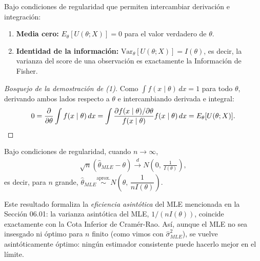 \begin{propiedad}
	Bajo condiciones de regularidad que permiten intercambiar derivación e integración:
	\begin{enumerate}
		\item \textbf{Media cero:} $E_\theta[U(\theta;X)] = 0$ para el valor verdadero de $\theta$.
		\item \textbf{Identidad de la información:} $\text{Var}_\theta[U(\theta;X)] = I(\theta)$, es decir, la varianza del score de una observación es exactamente la Información de Fisher.
	\end{enumerate}
\end{propiedad}

\begin{proof}[Bosquejo de la demostración de (1)]
	Como $\int f(x\mid\theta)\,dx=1$ para todo $\theta$, derivando ambos lados respecto a $\theta$ e intercambiando derivada e integral:
	\begin{align}
		0 = \frac{\partial}{\partial\theta}\int f(x\mid\theta)\,dx = \int \frac{\partial f(x\mid\theta)/\partial\theta}{f(x\mid\theta)} f(x\mid\theta)\,dx = E_\theta[U(\theta;X)]. \qedhere
	\end{align}
\end{proof}

\begin{teorema}
	 \label{eq:6.3.1}
	Bajo condiciones de regularidad, cuando $n\to\infty$,
	\begin{align}
		\sqrt{n}\left(\hat\theta_{MLE} - \theta\right) \xrightarrow{d} N\!\left(0,\, \frac{1}{I(\theta)}\right),
	\end{align}
	es decir, para $n$ grande, $\hat\theta_{MLE} \overset{\text{aprox.}}{\sim} N\!\left(\theta,\, \dfrac{1}{nI(\theta)}\right)$.
\end{teorema}

\begin{observacion}
	Este resultado formaliza la \emph{eficiencia asintótica} del MLE mencionada en la Sección 06.01: la varianza asintótica del MLE, $1/(nI(\theta))$, coincide exactamente con la Cota Inferior de Cramér-Rao. Así, aunque el MLE no sea insesgado ni óptimo para $n$ finito (como vimos con $\hat\sigma^2_{MLE}$), se vuelve asintóticamente óptimo: ningún estimador consistente puede hacerlo mejor en el límite.
\end{observacion}

